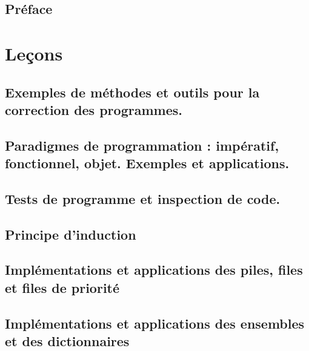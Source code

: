 




%

\tableofcontents

\chapter*{Préface}
%

\part{Leçons}

\chapter{Exemples de méthodes et outils pour la correction des programmes.} \label{L1}


\chapter{Paradigmes de programmation : impératif, fonctionnel, objet. Exemples et applications.} \label{L2}


\chapter{Tests de programme et inspection de code.}
\label{L3}


\chapter{Principe d'induction}
\label{L4}


\chapter{Implémentations et applications des piles, files et files de priorité}
\label{L5}


\chapter{Implémentations et applications des ensembles et des dictionnaires}
\label{L6}


